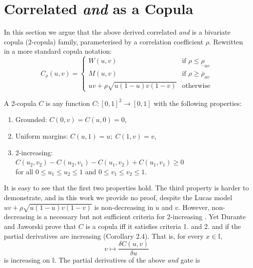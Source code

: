 \documentclass[runningheads]{llncs}
\begin{document}


\section{Correlated \textit{and} as a Copula}

In this section we argue that the above derived correlated \textit{and} is a bivariate copula (2-copula) family, parameterised by a correlation coefficient $\rho$. Rewritten in a more standard copula notation:
\begin{equation*}
  C_{\rho}(u,v) =
    \begin{cases}
      W(u,v) & \text{if } \rho \le \underline{\rho}_{uv} \\
      M(u,v)& \text{if } \rho \ge \overline{\rho}_{uv} \\
      uv + \rho\sqrt{u(1- u)v(1- v)}& \text{otherwise}
    \end{cases}
\end{equation*}


\noindent A 2-copula $C$ is any function $C:[0,1]^2 \rightarrow [0,1]$ with the following properties:

\begin{enumerate}
  \item Grounded: $C(0,v) = C(u,0) = 0$,
  \item Uniform margins: $C(u,1) = u; \;C(1,v) = v$,
  \item 2-increasing: \\ $C(u_{2},v_{2}) - C_{}(u_{2}, v_{1}) - C(u_{1}, v_{2}) + C(u_{1}, v_{1}) \ge 0$\\ for all $0 \le u_{1} \le u_{2} \le 1$ and $0 \le v_{1} \le v_{2} \le 1$.
\end{enumerate}
\noindent It is easy to see that the first two properties hold. The third property is harder to demonstrate, and in this work we provide no proof, despite the Lucas model $uv + \rho\sqrt{u(1- u)v(1- v)}$ is non-decreasing in $u$ and $v$. However, non-decreasing is a necessary but not sufficient criteria for 2-increasing \cite{schweizer2011probabilistic}. Yet Durante and Jaworski \cite{durante2010new}  prove that $C$ is a copula iff it satisfies criteria 1. and 2. and if the partial derivatives are increasing (Corollary 2.4). That is, for every $x \in \mathbb{I}$,
\begin{equation*}
    v \mapsto \frac{\delta C(u,v)}{\delta u}
\end{equation*}
\noindent is increasing on $\mathbb{I}$. The partial derivatives of the above \textit{and} gate is
\end{document}
